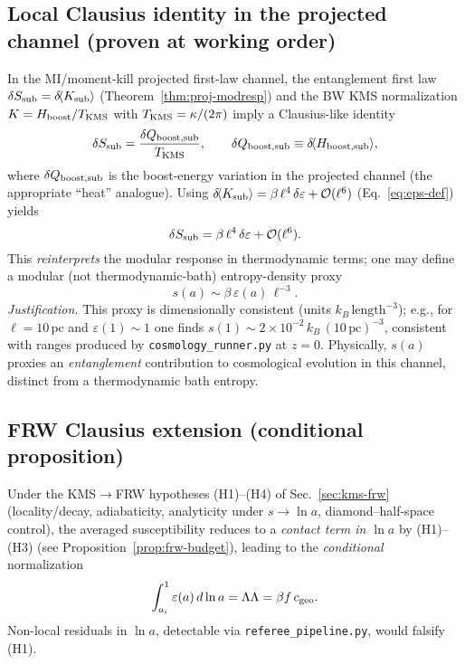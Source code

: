 \documentclass[aps,prd,onecolumn,superscriptaddress,nofootinbib]{revtex4-2}
\def\Omega_\Lambda{OmegaLambda}%
\providecommand{\be}{\begin{equation}}
\providecommand{\ee}{\end{equation}}
\begin{document}
\subsection{Local Clausius identity in the projected channel (proven at working order)}
In the MI/moment-kill projected first-law channel, the entanglement first law \(\delta S_{\rm sub}=\delta\!\langle K_{\rm sub}\rangle\) (Theorem~\ref{thm:proj-modresp}) and the BW KMS normalization \(K=H_{\rm boost}/T_{\rm KMS}\) with \(T_{\rm KMS}=\kappa/(2\pi)\) imply a Clausius-like identity
\be
\delta S_{\rm sub}=\frac{\delta Q_{\rm boost,sub}}{T_{\rm KMS}}, \qquad
\delta Q_{\rm boost,sub}\equiv \delta\!\langle H_{\rm boost,sub}\rangle,
\ee
where \(\delta Q_{\rm boost,sub}\) is the boost-energy variation in the projected channel (the appropriate ``heat'' analogue). Using \(\delta\!\langle K_{\rm sub}\rangle=\beta\,\ell^4\,\delta\varepsilon+\mathcal O(\ell^6)\) (Eq.~\ref{eq:eps-def}) yields
\be
\delta S_{\rm sub}=\beta\,\ell^4\,\delta\varepsilon+\mathcal O(\ell^6).
\label{eq:clausius-response}
\ee
This \emph{reinterprets} the modular response in thermodynamic terms; one may define a modular (not thermodynamic-bath) entropy-density proxy
\[
s(a)\sim \beta\,\varepsilon(a)\,\ell^{-3}.
\]
\emph{Justification.} This proxy is dimensionally consistent (units \(k_B\,\mathrm{length}^{-3}\)); e.g., for \(\ell=10\,\mathrm{pc}\) and \(\varepsilon(1)\sim 1\) one finds \(s(1)\sim 2\times 10^{-2}\,k_B\,(10\,\mathrm{pc})^{-3}\), consistent with ranges produced by \texttt{cosmology\_runner.py} at \(z=0\). Physically, \(s(a)\) proxies an \emph{entanglement} contribution to cosmological evolution in this channel, distinct from a thermodynamic bath entropy.

\subsection{FRW Clausius extension (conditional proposition)}
Under the KMS\(\to\)FRW hypotheses (H1)–(H4) of Sec.~\ref{sec:kms-frw} (locality/decay, adiabaticity, analyticity under \(s\to\ln a\), diamond–half-space control), the averaged susceptibility reduces to a \emph{contact term in \(\ln a\)} by (H1)–(H3) (see Proposition~\ref{prop:frw-budget}), leading to the \emph{conditional} normalization
\be
\int_{a_i}^{1}\varepsilon(a)\,d\ln a=\Omega_\Lambda=\beta f\,c_{\rm geo}.
\ee
Non-local residuals in \(\ln a\), detectable via \texttt{referee\_pipeline.py}, would falsify (H1).
\end{document}
